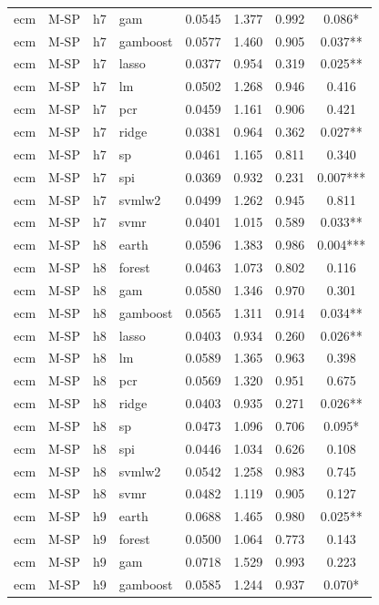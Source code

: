 \begin{ThreePartTable}
\begin{longtable}[t]{llclcccc}
ecm & M-SP & h7 & gam & 0.0545 & 1.377 & 0.992 & 0.086*\\
ecm & M-SP & h7 & gamboost & 0.0577 & 1.460 & 0.905 & 0.037**\\
ecm & M-SP & h7 & lasso & 0.0377 & 0.954 & 0.319 & 0.025**\\
ecm & M-SP & h7 & lm & 0.0502 & 1.268 & 0.946 & 0.416\\
ecm & M-SP & h7 & pcr & 0.0459 & 1.161 & 0.906 & 0.421\\
ecm & M-SP & h7 & ridge & 0.0381 & 0.964 & 0.362 & 0.027**\\
ecm & M-SP & h7 & sp & 0.0461 & 1.165 & 0.811 & 0.340\\
ecm & M-SP & h7 & spi & 0.0369 & 0.932 & 0.231 & 0.007***\\
ecm & M-SP & h7 & svmlw2 & 0.0499 & 1.262 & 0.945 & 0.811\\
ecm & M-SP & h7 & svmr & 0.0401 & 1.015 & 0.589 & 0.033**\\
\addlinespace
ecm & M-SP & h8 & earth & 0.0596 & 1.383 & 0.986 & 0.004***\\
ecm & M-SP & h8 & forest & 0.0463 & 1.073 & 0.802 & 0.116\\
ecm & M-SP & h8 & gam & 0.0580 & 1.346 & 0.970 & 0.301\\
ecm & M-SP & h8 & gamboost & 0.0565 & 1.311 & 0.914 & 0.034**\\
ecm & M-SP & h8 & lasso & 0.0403 & 0.934 & 0.260 & 0.026**\\
ecm & M-SP & h8 & lm & 0.0589 & 1.365 & 0.963 & 0.398\\
ecm & M-SP & h8 & pcr & 0.0569 & 1.320 & 0.951 & 0.675\\
ecm & M-SP & h8 & ridge & 0.0403 & 0.935 & 0.271 & 0.026**\\
ecm & M-SP & h8 & sp & 0.0473 & 1.096 & 0.706 & 0.095*\\
ecm & M-SP & h8 & spi & 0.0446 & 1.034 & 0.626 & 0.108\\
ecm & M-SP & h8 & svmlw2 & 0.0542 & 1.258 & 0.983 & 0.745\\
ecm & M-SP & h8 & svmr & 0.0482 & 1.119 & 0.905 & 0.127\\
\addlinespace
ecm & M-SP & h9 & earth & 0.0688 & 1.465 & 0.980 & 0.025**\\
ecm & M-SP & h9 & forest & 0.0500 & 1.064 & 0.773 & 0.143\\
ecm & M-SP & h9 & gam & 0.0718 & 1.529 & 0.993 & 0.223\\
ecm & M-SP & h9 & gamboost & 0.0585 & 1.244 & 0.937 & 0.070*\\

\end{longtable}
\end{ThreePartTable}
